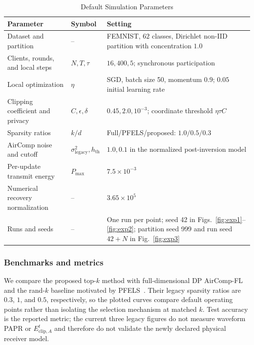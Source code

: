 \documentclass[journal]{IEEEtran}
\newcommand{\rev}[1]{{\color{revisionred}#1}}
\begin{document}
\begin{table}[!t]
	\caption{Default Simulation Parameters}
	\label{tab:simulation_parameters}
	\centering
	\scriptsize
	\setlength{\tabcolsep}{2pt}
	\renewcommand{\arraystretch}{0.92}
	\begin{tabularx}{\columnwidth}{@{}p{}p{}X@{}}
		\hline
		Parameter & Symbol & Setting \\
		\hline
		Dataset and partition & -- & FEMNIST, $62$ classes, Dirichlet non-IID partition with concentration $1.0$ \\
		Clients, rounds, and local steps & $N,T,\tau$ & $16,400,5$; synchronous participation \\
		Local optimization & $\eta$ & SGD, batch size 50, momentum 0.9; $0.05$ initial learning rate \\
		Clipping coefficient and privacy & $C,\epsilon,\delta$ & $0.45,2.0,10^{-3}$; coordinate threshold $\eta\tau C$ \\
		Sparsity ratios & $k/d$ & Full/PFELS/proposed: $1.0/0.5/0.3$ \\
		\rev{AirComp noise and cutoff} & \rev{$\sigma_{\mathrm{legacy}}^2,h_{\mathrm{th}}$} & \rev{$1.0,0.1$ in the normalized post-inversion model} \\
		\rev{Per-update transmit energy} & \rev{$P_{\max}$} & \rev{$7.5\times10^{-3}$} \\
		\rev{Numerical recovery normalization} & \rev{--} & \rev{$3.65\times10^5$} \\
		Runs and seeds & -- & One run per point; seed 42 in Figs.~\ref{fig:exp1}--\ref{fig:exp2}; partition seed 999 and run seed $42+N$ in Fig.~\ref{fig:exp3} \\
		\hline
	\end{tabularx}
\end{table}

\subsubsection{Benchmarks and metrics}
We compare the proposed top-$k$ method with full-dimensional DP AirComp-FL~\cite{hu2024communication} and the rand-$k$ baseline motivated by PFELS~\cite{zhang2023communication}. Their legacy sparsity ratios are $0.3$, $1$, and $0.5$, respectively, so the plotted curves compare default operating points rather than isolating the selection mechanism at matched $k$. Test accuracy is the reported metric; the current three legacy figures do not measure waveform PAPR or $E_{\mathrm{clip},A}^t$ and therefore do not validate the newly declared physical receiver model.
\end{document}
